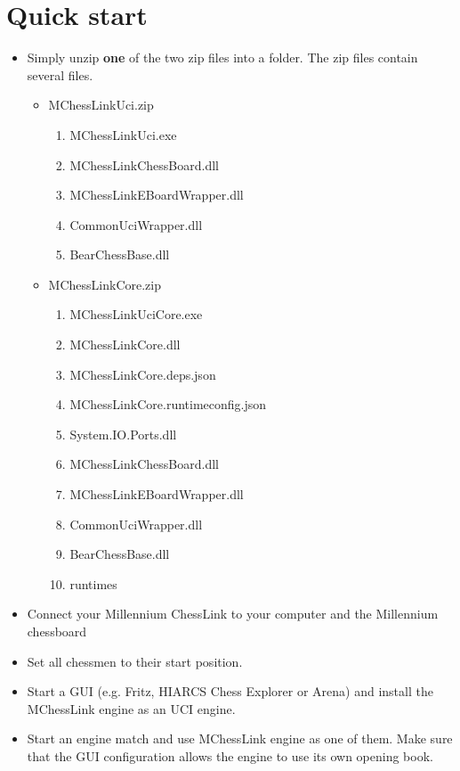 \documentclass[11pt,a4paper]{article}
\begin{document}
\section{Quick start}
\begin{itemize}
	\item Simply unzip \textbf{one} of the two zip files into a folder. The zip files contain several files.
    \begin{itemize}
		\item MChessLinkUci.zip
      	\begin{enumerate}
  		 	\item MChessLinkUci.exe
			\item MChessLinkChessBoard.dll
			\item MChessLinkEBoardWrapper.dll
			\item CommonUciWrapper.dll
			\item BearChessBase.dll
		\end{enumerate}
	    \item MChessLinkCore.zip
		   \begin{enumerate}
			   	\item MChessLinkUciCore.exe
				\item MChessLinkCore.dll
				\item MChessLinkCore.deps.json
				\item MChessLinkCore.runtimeconfig.json
				\item System.IO.Ports.dll
    			\item MChessLinkChessBoard.dll
                \item MChessLinkEBoardWrapper.dll
                \item CommonUciWrapper.dll
                \item BearChessBase.dll
				\item runtimes
		   \end{enumerate}
    \end{itemize}
	\item Connect your Millennium ChessLink to your computer and the Millennium chessboard
	\item Set all chessmen to their start position.
	\item Start a GUI (e.g. Fritz, HIARCS Chess Explorer or Arena) and install the MChessLink engine as an UCI engine.
	\item Start an engine match and use MChessLink engine as one of them. Make sure that the GUI configuration allows the engine to use its own opening book.
\end{itemize}
\end{document}
